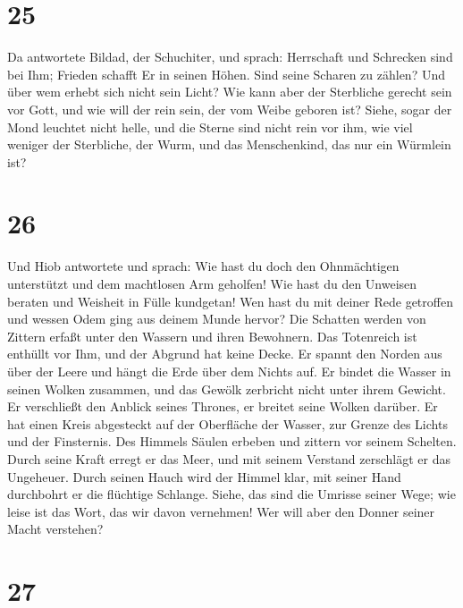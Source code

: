 \hypertarget{section-24}{%
\section{25}\label{section-24}}

 Da antwortete Bildad, der Schuchiter, und sprach:
 Herrschaft und Schrecken sind bei Ihm; Frieden schafft Er
in seinen Höhen.  Sind seine Scharen zu zählen? Und über
wem erhebt sich nicht sein Licht?  Wie kann aber der
Sterbliche gerecht sein vor Gott, und wie will der rein sein, der vom
Weibe geboren ist?  Siehe, sogar der Mond leuchtet nicht
helle, und die Sterne sind nicht rein vor ihm,  wie viel
weniger der Sterbliche, der Wurm, und das Menschenkind, das nur ein
Würmlein ist?

\hypertarget{section-25}{%
\section{26}\label{section-25}}

 Und Hiob antwortete und sprach:  Wie hast
du doch den Ohnmächtigen unterstützt und dem machtlosen Arm geholfen!
 Wie hast du den Unweisen beraten und Weisheit in Fülle
kundgetan!  Wen hast du mit deiner Rede getroffen und
wessen Odem ging aus deinem Munde hervor?  Die Schatten
werden von Zittern erfaßt unter den Wassern und ihren Bewohnern.
 Das Totenreich ist enthüllt vor Ihm, und der Abgrund hat
keine Decke.  Er spannt den Norden aus über der Leere und
hängt die Erde über dem Nichts auf.  Er bindet die Wasser
in seinen Wolken zusammen, und das Gewölk zerbricht nicht unter ihrem
Gewicht.  Er verschließt den Anblick seines Thrones, er
breitet seine Wolken darüber.  Er hat einen Kreis
abgesteckt auf der Oberfläche der Wasser, zur Grenze des Lichts und der
Finsternis.  Des Himmels Säulen erbeben und zittern vor
seinem Schelten.  Durch seine Kraft erregt er das Meer,
und mit seinem Verstand zerschlägt er das Ungeheuer. 
Durch seinen Hauch wird der Himmel klar, mit seiner Hand durchbohrt er
die flüchtige Schlange.  Siehe, das sind die Umrisse
seiner Wege; wie leise ist das Wort, das wir davon vernehmen! Wer will
aber den Donner seiner Macht verstehen?

\hypertarget{section-26}{%
\section{27}\label{section-26}}

